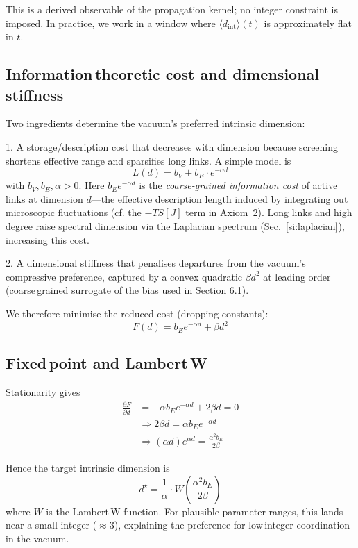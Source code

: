 \documentclass[11pt]{article}
\begin{document}
This is a derived observable of the propagation kernel; no integer constraint is imposed. In practice, we work in a window where $\langle d_{\text{int}} \rangle(t)$ is approximately flat in $t$.

\subsection{Information\,theoretic cost and dimensional stiffness}

Two ingredients determine the vacuum's preferred intrinsic dimension:

1. A storage/description cost that decreases with dimension because screening shortens effective range and sparsifies long links. A simple model is
\begin{equation}
L(d) = b_V + b_E \cdot e^{- \alpha d}
\end{equation}
with $b_V, b_E, \alpha > 0$. Here $b_E e^{-\alpha d}$ is the \emph{coarse-grained information cost} of active links at dimension $d$—the effective description length induced by integrating out microscopic fluctuations (cf. the $-T S[J]$ term in Axiom~2). Long links and high degree raise spectral dimension via the Laplacian spectrum (Sec.~\ref{si:laplacian}), increasing this cost.

2. A dimensional stiffness that penalises departures from the vacuum's compressive preference, captured by a convex quadratic $\beta d^2$ at leading order (coarse\,grained surrogate of the bias used in Section 6.1).

We therefore minimise the reduced cost (dropping constants):
\begin{equation}
F(d) = b_E e^{- \alpha d} + \beta d^2
\end{equation}

\subsection{Fixed\,point and Lambert\,W}

Stationarity gives
\begin{align}
\frac{\partial F}{\partial d} &= - \alpha b_E e^{- \alpha d} + 2 \beta d = 0\\
&\Rightarrow 2 \beta d = \alpha b_E e^{- \alpha d}\\
&\Rightarrow (\alpha d) e^{\alpha d} = \frac{\alpha^2 b_E}{2 \beta}
\end{align}

Hence the target intrinsic dimension is
\begin{equation}
d^\star = \frac{1}{\alpha} \cdot W\left( \frac{\alpha^2 b_E}{2 \beta} \right)
\end{equation}
where $W$ is the Lambert\,W function. For plausible parameter ranges, this lands near a small integer ($\approx 3$), explaining the preference for low\,integer coordination in the vacuum.
\end{document}
